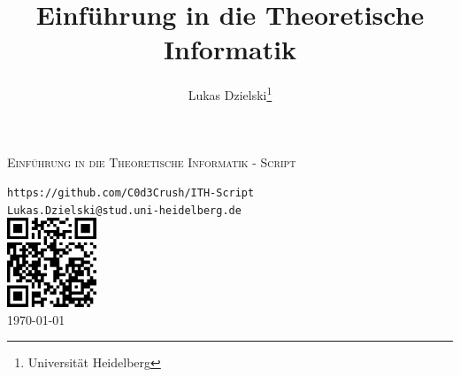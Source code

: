 \documentclass{article}
\begin{document}
\begin{titlepage}
  
    \centering
    \vspace*{2cm}
  
    \vspace{1cm}
  
    \textsc{\Large Einführung in die Theoretische Informatik - Script}\\[1.5cm]
    
    \title{Einführung in die Theoretische Informatik}
    \author{Lukas Dzielski\thanks{Universität Heidelberg}}
    
    \texttt{\large https://github.com/C0d3Crush/ITH-Script}\\
    \texttt{\large Lukas.Dzielski@stud.uni-heidelberg.de}\\[2cm]

    \includegraphics[width=0.2\textwidth]{qrcode.png}\\[10cm]

  
    {\large \today}\\[2cm]
  
    \vfill
  
\end{titlepage}
\newpage
\tableofcontents
\newpage






\end{document}
